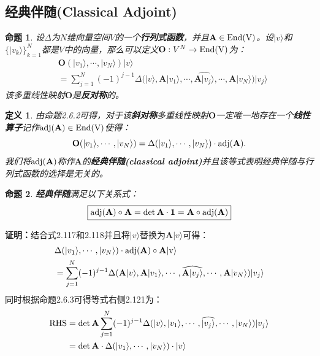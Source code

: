 \documentclass[mathserif,hyperref,UTF8,openany,b5paper]{ctexbook}
\newtheorem{defn}{定义}[section]
\newtheorem{pro}{命题}[section]
\begin{document}
\subsection{经典伴随(Classical Adjoint)}
\begin{pro}
设$\Delta$为$N$维向量空间$V$的一个\textbf{行列式函数}，并且$\mathbf{A}\in\rm End(V)$。设$|v\rangle$和$\{|v_k\rangle\}^N_{k=1}$都是$V$中的向量，那么可以定义$\mathbf{O}:V^N\xrightarrow{}\rm End(V)$为：
\begin{align}
    &\mathbf{O}(|v_1\rangle,\cdots,|v_N\rangle)|v\rangle\\
    &=\sum_{j=1}^N(-1)^{j-1}\Delta(|v\rangle,\mathbf{A}|v_1\rangle,\cdots,\widehat{\mathbf{A}|v_j\rangle},\cdots,\mathbf{A}|v_N\rangle)|v_j\rangle
\end{align}
该多重线性映射$\mathbf{O}$是\textbf{反对称}的。
\end{pro}
\begin{defn}
由命题2.6.2可得，对于该\textbf{斜对称}多重线性映射$\mathbf{O}$一定唯一地存在一个\textbf{线性算子}记作$\rm{adj}(\mathbf{A})\in\rm{End}(V)$使得：
\begin{equation}
    \mathbf{O}(|v_1\rangle,\cdots,|v_N\rangle)=\Delta(|v_1\rangle,\cdots,|v_N\rangle)\cdot\rm{adj}(\mathbf{A}).
\end{equation}我们将$\rm adj(\mathbf{A})$称作$\mathbf{A}$的\textbf{经典伴随(classical adjoint)}并且该等式表明经典伴随与行列式函数的选择是无关的。
\end{defn}
\begin{pro}
\textbf{经典伴随}满足以下关系式：
\begin{equation}
\boxed{\rm{adj}(\mathbf{A})\circ\mathbf{A}=\det \mathbf{A}\cdot\mathbf{1}=\mathbf{A}\circ\rm{adj}(\mathbf{A})}
\end{equation}
\end{pro}
\textbf{证明：}结合式2.117和2.118并且将$|v\rangle$替换为$\mathbf{A}|v\rangle$可得：
\begin{align}
    &\Delta(|v_1\rangle,\cdots,|v_N\rangle)\cdot\rm{adj}(\mathbf{A})\circ\mathbf{A}|v\rangle\\
    &=\sum_{j=1}^N(-1)^{j-1}\Delta(\mathbf{A}|v\rangle,\mathbf{A}|v_1\rangle,\cdots,\widehat{\mathbf{A}|v_j\rangle},\cdots,\mathbf{A}|v_N\rangle)|v_j\rangle
\end{align}
同时根据命题2.6.3可得等式右侧2.121为：
\begin{align}
    \rm{RHS}&=\det \mathbf{A}\sum_{j=1}^N(-1)^{j-1}\Delta(|v\rangle,|v_1\rangle,\cdots,\widehat{|v_j\rangle},\cdots,|v_N\rangle)|v_j\rangle\\
    &=\det \mathbf{A}\cdot\Delta(|v_1\rangle,\cdots,|v_N\rangle)\cdot|v\rangle
\end{align}
\end{document}
